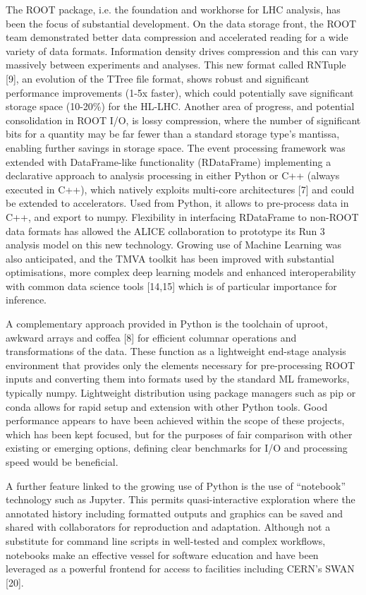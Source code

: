 \documentclass[10pt,a4paper]{article}
\begin{document}
The ROOT package, i.e. the foundation and workhorse for LHC analysis,
has been the focus of substantial development. On the data storage
front, the ROOT team demonstrated better data compression and
accelerated reading for a wide variety of data formats. Information
density drives compression and this can vary massively between
experiments and analyses. This new format called RNTuple {[}9{]}, an
evolution of the TTree file format, shows robust and significant
performance improvements (1-5x faster), which could potentially save
significant storage space (10-20\%) for the HL-LHC. Another area of
progress, and potential consolidation in ROOT I/O, is lossy compression,
where the number of significant bits for a quantity may be far fewer
than a standard storage type's mantissa, enabling further savings in
storage space. The event processing framework was extended with
DataFrame-like functionality (RDataFrame) implementing a declarative
approach to analysis processing in either Python or C++ (always executed
in C++), which natively exploits multi-core architectures {[}7{]} and
could be extended to accelerators. Used from Python, it allows to
pre-process data in C++, and export to numpy. Flexibility in interfacing
RDataFrame to non-ROOT data formats has allowed the ALICE collaboration
to prototype its Run 3 analysis model on this new technology. Growing
use of Machine Learning was also anticipated, and the TMVA toolkit has
been improved with substantial optimisations, more complex deep learning
models and enhanced interoperability with common data science tools
{[}14,15{]} which is of particular importance for inference.

A complementary approach provided in Python is the toolchain of uproot,
awkward arrays and coffea {[}8{]} for efficient columnar operations and
transformations of the data. These function as a lightweight end-stage
analysis environment that provides only the elements necessary for
pre-processing ROOT inputs and converting them into formats used by the
standard ML frameworks, typically numpy. Lightweight distribution using
package managers such as pip or conda allows for rapid setup and
extension with other Python tools. Good performance appears to have been
achieved within the scope of these projects, which has been kept
focused, but for the purposes of fair comparison with other existing or
emerging options, defining clear benchmarks for I/O and processing speed
would be beneficial.

A further feature linked to the growing use of Python is the use of
``notebook'' technology such as Jupyter. This permits quasi-interactive
exploration where the annotated history including formatted outputs and
graphics can be saved and shared with collaborators for reproduction and
adaptation. Although not a substitute for command line scripts in
well-tested and complex workflows, notebooks make an effective vessel
for software education and have been leveraged as a powerful frontend
for access to facilities including CERN's SWAN {[}20{]}.
\end{document}
